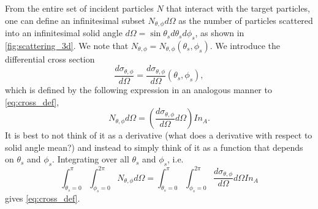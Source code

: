 \documentclass[a4paper,11pt]{report}
\begin{document}
From the entire set of incident particles $N$ that interact with the target particles, one can define an infinitesimal subset $N_{\theta,\phi} d\Omega$ as the number of particles scattered into an infinitesimal solid angle $d\Omega = \sin \theta_s d\theta_s d\phi_s$, as shown in \cref{fig:scattering_3d}. We note that $N_{\theta,\phi} = N_{\theta,\phi} (\theta_s, \phi_s)$. We introduce the differential cross section
\begin{equation}
    \frac{d\sigma_{\theta,\phi}}{d\Omega} = \frac{d\sigma_{\theta,\phi}}{d\Omega}(\theta_s,\phi_s),
\end{equation}
which is defined by the following expression in an analogous manner to \cref{eq:cross_def},
\begin{equation}
    \label{eq:cross_def_diff}
    N_{\theta, \phi} d\Omega = \left ( \frac{d\sigma_{\theta,\phi}}{d\Omega} d\Omega \right ) I n_A.
\end{equation}
It is best to not think of it as a derivative (what does a derivative with respect to solid angle mean?) and instead to simply think of it as a function that depends on $\theta_s$ and $\phi_s$. Integrating over all $\theta_s$ and $\phi_s$, i.e.
\begin{equation*}
    \int_{\theta_s = 0}^\pi \int_{\phi_s = 0}^{2\pi} N_{\theta, \phi} d\Omega = \int_{\theta_s = 0}^\pi \int_{\phi_s = 0}^{2\pi} \frac{d\sigma_{\theta,\phi}}{d\Omega}  d\Omega I n_A
\end{equation*}
gives \cref{eq:cross_def}.
\end{document}
